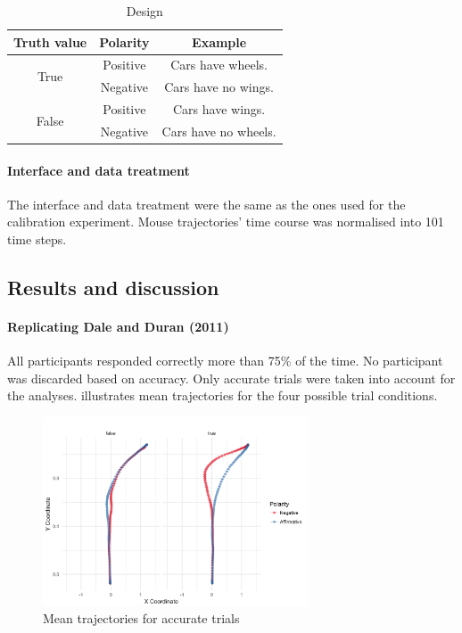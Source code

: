 \documentclass{article}
\begin{document}
\begin{table}[h]
\centering
\begin{tabular}{ccc}
Truth value & Polarity & Example \\
\hline
\multirow{2}{*}{True} & Positive & Cars have wheels.\\ 
 & Negative & Cars have no wings.\\ 
\hline
\multirow{2}{*}{False} & Positive & Cars have wings.\\ 
 & Negative & Cars have no wheels.\\
\end{tabular}
\caption{Design} \label{table:exampleDD}
\end{table}


\paragraph{Interface and data treatment}
The interface and data treatment were the same as the ones used for the calibration experiment. Mouse trajectories' time course was normalised into 101 time steps.

\subsection{Results and discussion}
\paragraph{Replicating Dale and Duran (2011)}
All participants responded correctly more than 75\% of the time. No participant was discarded based on accuracy.  Only accurate trials were taken into account for the analyses.  illustrates mean trajectories for the four possible trial conditions.
\begin{figure}
\centering
\includegraphics[width=0.7\textwidth]{negation-data-mean-trajectory.png}
\caption{Mean trajectories for accurate trials} \label{fig:mean.trajectory-negation}
\end{figure}
\end{document}
